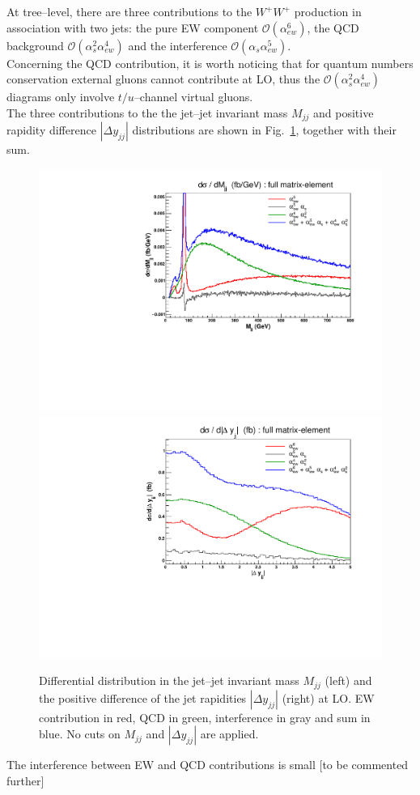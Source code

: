 At tree--level, there are three contributions to the $W^+W^+$ production in association with two jets: the pure EW component $\mathcal{O}(\alpha_{ew}^6)$, the QCD background $\mathcal{O}(\alpha_s^2\alpha_{ew}^4)$ and the interference $\mathcal{O}(\alpha_s\alpha_{ew}^5)$.\\
Concerning the QCD contribution, it is worth noticing that for quantum numbers conservation external gluons cannot contribute at LO, thus the $\mathcal{O}(\alpha_s^2\alpha_{ew}^4)$ diagrams only involve $t/u$--channel virtual gluons.\\

The three contributions to the the jet--jet invariant mass $M_{jj}$ and positive rapidity difference $|\Delta y_{jj}|$ distributions are shown in Fig.~\ref{fig:mjjdyjj_1d}, together with their sum.
\begin{figure}[hbt]
\centering
\includegraphics[scale=0.395]{figures/scanfigures/mjj_full.pdf}
\includegraphics[scale=0.395]{figures/scanfigures/dyjj_full.pdf}
\caption{Differential distribution in the jet--jet invariant mass $M_{jj}$ (left) and the positive difference of the jet rapidities $|\Delta y_{jj}|$ (right) at LO. EW contribution in red, QCD in green, interference in gray and sum in blue. No cuts on $M_{jj}$ and $|\Delta y_{jj}|$ are applied.}
\label{fig:mjjdyjj_1d}
\end{figure}
The interference between EW and QCD contributions is small [to be commented further]

